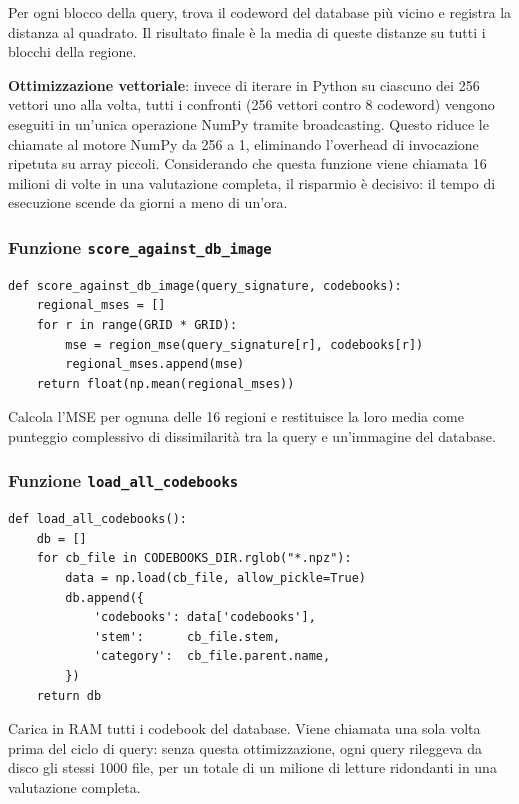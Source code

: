 \documentclass[12pt, a4paper]{article}
\begin{document}
Per ogni blocco della query, trova il codeword del database più vicino e registra la distanza
al quadrato. Il risultato finale è la media di queste distanze su tutti i blocchi della
regione.

\textbf{Ottimizzazione vettoriale}: invece di iterare in Python su ciascuno dei 256 vettori
uno alla volta, tutti i confronti (256 vettori contro 8 codeword) vengono eseguiti in
un'unica operazione NumPy tramite broadcasting. Questo riduce le chiamate al motore NumPy
da 256 a 1, eliminando l'overhead di invocazione ripetuta su array piccoli. Considerando
che questa funzione viene chiamata 16 milioni di volte in una valutazione completa, il
risparmio è decisivo: il tempo di esecuzione scende da giorni a meno di un'ora.

\subsubsection{Funzione \texttt{score\_against\_db\_image}}

\begin{lstlisting}[caption={Funzione \texttt{score\_against\_db\_image}}]
def score_against_db_image(query_signature, codebooks):
    regional_mses = []
    for r in range(GRID * GRID):
        mse = region_mse(query_signature[r], codebooks[r])
        regional_mses.append(mse)
    return float(np.mean(regional_mses))
\end{lstlisting}

Calcola l'MSE per ognuna delle 16 regioni e restituisce la loro media come punteggio
complessivo di dissimilarità tra la query e un'immagine del database.

\subsubsection{Funzione \texttt{load\_all\_codebooks}}

\begin{lstlisting}[caption={Funzione \texttt{load\_all\_codebooks}}]
def load_all_codebooks():
    db = []
    for cb_file in CODEBOOKS_DIR.rglob("*.npz"):
        data = np.load(cb_file, allow_pickle=True)
        db.append({
            'codebooks': data['codebooks'],
            'stem':      cb_file.stem,
            'category':  cb_file.parent.name,
        })
    return db
\end{lstlisting}

Carica in RAM tutti i codebook del database. Viene chiamata una sola volta prima del ciclo
di query: senza questa ottimizzazione, ogni query rileggeva da disco gli stessi 1000 file,
per un totale di un milione di letture ridondanti in una valutazione completa.
\end{document}
